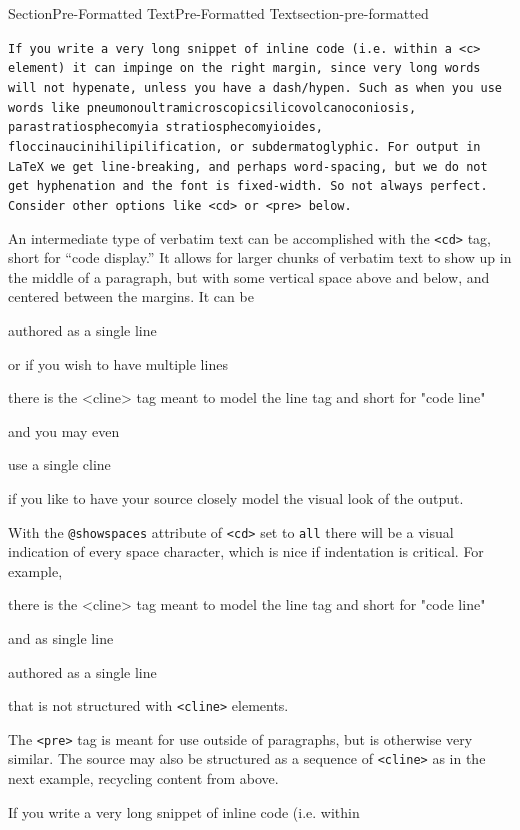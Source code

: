 \documentclass[twoside,10pt,]{article}
\newcommand{\mono}[1]{\texttt{#1}}
\numberwithin{equation}{section}
\begin{document}
\begin{sectionptx}{Section}{Pre-Formatted Text}{}{Pre-Formatted Text}{}{}{section-pre-formatted}
\par
\mono{If you write a very long snippet of inline code (i.e. within a <c> element) it can impinge on the right margin, since very long words will not hypenate, unless you have a dash/hypen.  Such as when you use words like pneumonoultramicroscopicsilicovolcanoconiosis, parastratiosphecomyia stratiosphecomyioides, floccinaucinihilipilification, or subdermatoglyphic.  For output in LaTeX we get line-breaking, and perhaps word-spacing, but we do not get hyphenation and the font is fixed-width.  So not always perfect.  Consider other options like <cd> or <pre> below.}%
\par
An intermediate type of verbatim text can be accomplished with the \mono{<cd>} tag, short for ``code display.''  It allows for larger chunks of verbatim text to show up in the middle of a paragraph, but with some vertical space above and below, and centered between the margins.  It can be%
\begin{codedisplay}
authored as a single line
\end{codedisplay}
or if you wish to have multiple lines%
\begin{codedisplay}
there is the <cline> tag
meant to model the line tag
and short for "code line"
\end{codedisplay}
and you may even%
\begin{codedisplay}
use a single cline
\end{codedisplay}
if you like to have your source closely model the visual look of the output.%
\par
With the \mono{@showspaces} attribute of \mono{<cd>} set to \mono{all} there will be a visual indication of every space character, which is nice if indentation is critical.  For example,%
\begin{codedisplay}[showspaces=true]
there is the <cline> tag
    meant to model the line tag
        and short for "code line"
\end{codedisplay}
and as single line%
\begin{codedisplay}[showspaces=true]
authored as a single line
\end{codedisplay}
that is not structured with \mono{<cline>} elements.%
\par
The \mono{<pre>} tag is meant for use outside of paragraphs, but is otherwise very similar.  The source may also be structured as a sequence of \mono{<cline>} as in the next example, recycling content from above.%
\begin{preformatted}
If you write a very long snippet of inline code (i.e. within

\end{preformatted}
\end{sectionptx}
\end{document}
